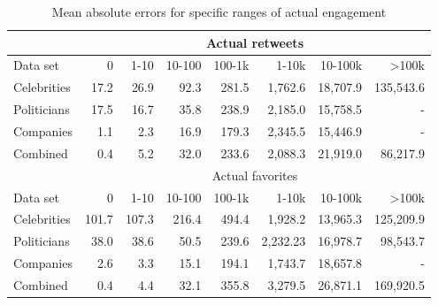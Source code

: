 \begin{table}
  \begin{tabular}{lrrrrrrr}
    \toprule
    & \multicolumn{7}{c}{Actual retweets} \\
    \midrule
    Data set & 0 & 1-10 & 10-100 & 100-1k & 1-10k & 10-100k & >100k \\
    \midrule
    Celebrities & 17.2 & 26.9 & 92.3 & 281.5 & 1,762.6 & 18,707.9 & 135,543.6 \\
    Politicians & 17.5 & 16.7 & 35.8 & 238.9 & 2,185.0 & 15,758.5 & - \\
    Companies & 1.1 & 2.3 & 16.9 & 179.3 & 2,345.5 & 15,446.9 & - \\
    Combined & 0.4 & 5.2 & 32.0 & 233.6 & 2,088.3 & 21,919.0 & 86,217.9 \\
    \bottomrule
    \toprule
    & \multicolumn{7}{c}{Actual favorites} \\
    \midrule
    Data set & 0 & 1-10 & 10-100 & 100-1k & 1-10k & 10-100k & >100k \\
    \midrule
    Celebrities & 101.7 & 107.3 & 216.4 & 494.4 & 1,928.2 & 13,965.3 & 125,209.9 \\
    Politicians & 38.0 & 38.6 & 50.5 & 239.6 & 2,232.23 & 16,978.7 & 98,543.7 \\
    Companies & 2.6 & 3.3 & 15.1 & 194.1 & 1,743.7 & 18,657.8 & - \\
    Combined & 0.4 & 4.4 & 32.1 & 355.8 & 3,279.5 & 26,871.1 & 169,920.5 \\
    \bottomrule
  \end{tabular}
  \caption[Detailed regression results for deep feedforward networks]{Mean absolute errors for specific ranges of actual engagement}
  \label{tab:d1_regression_eval}
\end{table}

